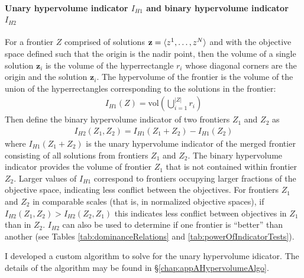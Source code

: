 \paragraph{Unary hypervolume indicator $I_{H1}$ and binary hypervolume indicator $I_{H2}$}
For a frontier $Z$ comprised of solutions $\mathbf{z}=\braket{z^1,\ldots,z^N}$ and with the objective space defined such that the origin is the nadir point, then the volume of a single solution $\mathbf{z}_i$ is the volume of the hyperrectangle $r_i$ whose diagonal corners are the origin and the solution $\mathbf{z}_i$. The hypervolume of the frontier is the volume of the union of the hyperrectangles corresponding to the solutions in the frontier:
\begin{align}
I_{H1} (Z) = \text{vol} \left( \bigcup_{i = 1}^{|Z|} r_i \right)
\end{align}
Then define the binary hypervolume indicator of two frontiers $Z_1$ and $Z_2$ as \cite{zitzler1999evolutionary}
\begin{align}
I_{H2} (Z_1,Z_2) = I_{H1} (Z_1 + Z_2) - I_{H1} (Z_2)
\end{align}
where $I_{H1} (Z_1 + Z_2)$ is the unary hypervolume indicator of the merged frontier consisting of all solutions from frontiers $Z_1$ and $Z_2$. The binary hypervolume indicator provides the volume of frontier $Z_1$ that is not contained within frontier $Z_2$. Larger values of $I_{H1}$ correspond to frontiers occupying larger fractions of the objective space, indicating less conflict between the objectives. For frontiers $Z_1$ and $Z_2$ in comparable scales (that is, in normalized objective spaces), if $I_{H2}(Z_1, Z_2) > I_{H2}(Z_2, Z_1)$ this indicates less conflict between objectives in $Z_1$ than in $Z_2$. $I_{H2}$ can also be used to determine if one frontier is ``better'' than another (see Tables \ref{tab:dominanceRelations} and \ref{tab:powerOfIndicatorTests}).


I developed a custom algorithm to solve for the unary hypervolume idicator. The details of the algorithm may be found in \S \ref{chap:appAHypervolumeAlgo}.

